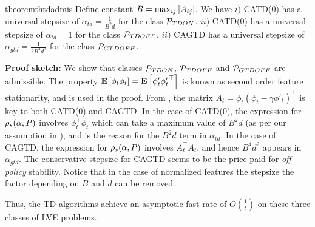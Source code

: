\begin{restatable}{theorem}{thtdadmis}\label{th:tdadmis}
Define constant $B\eqdef\max_{ij}\md{A_{ij}}$.  We have 
$i)$ CATD(0) has a universal stepsize of $\alpha_{td}=\frac{1}{B^2d}$ for  the class $\P_{TDON}$.
$ii)$ CATD(0) has a universal stepsize of $\alpha_{td}=1$ for  the class $\P_{TDOFF}$.
$ii)$ CAGTD has a universal stepsize of $\alpha_{gtd}=\frac{1}{2B^4d^2}$ for the class $\P_{GTDOFF}$.
\end{restatable}
\textbf{Proof sketch:} We show that classes $\P_{TDON}$, $\P_{TDOFF}$ and $\P_{GTDOFF}$ are admissible. The property $\EE{\phi_t\phi_t}=\EE{\phi'_t{\phi'_t}^\top}$ is known as second order feature stationarity, and is used in the proof.
 From , the matrix $A_t=\phi_t(\phi_t-\gamma\phi'_t)^\top$ is key to both CATD(0) and CAGTD. In the case of CATD(0),  the expression for $\rhos{P}$ involves $\phi^\top_t\phi_t$ which can take a maximum value of $B^2d$ (as per our assumption in ), and is the reason for the $B^2d$ term in $\alpha_{td}$. In the case of CAGTD, the expression for $\rhos{P}$ involves $A_t^\top A_t$, and hence $B^4d^2$ appears in $\alpha_{gtd}$. The conservative stepsize for CAGTD seems to be the price paid for \emph{off-policy} stability. Notice that in the case of normalized features the stepsize the factor depending on $B$ and $d$ can be removed.

Thus, the TD algorithms achieve an asymptotic fast rate of $O(\frac{1}{t})$ on these three classes of LVE problems.

